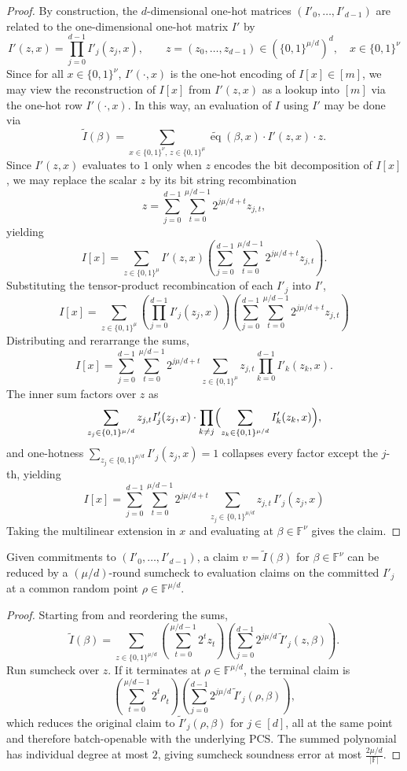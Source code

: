 \begin{proof}
By construction, the $d$-dimensional one-hot matrices $(I'_0,\ldots,I'_{d-1})$ are related to the one-dimensional one-hot matrix $I'$ by
\[
I'(z,x)=\prod_{j=0}^{d-1}I'_j(z_j,x),
\qquad
z=(z_0,\ldots,z_{d-1})\in(\{0,1\}^{\mu/d})^{d},
\quad
x\in\{0,1\}^{\nu}
\]
Since for all $x\in\{0,1\}^{\nu}$, $I'(\cdot,x)$ is the one-hot encoding of $I[x]\in[m]$,
we may view the reconstruction of $I[x]$ from $I'(z,x)$ as a lookup into $[m]$ via the one-hot row 
$I'(\cdot,x)$. In this way, an evaluation of $I$ using $I'$ may be done via
\[
\widetilde{I}(\beta)
=
\sum_{x\in\{0,1\}^{\nu},\,z\in\{0,1\}^{\mu}}
\widetilde{\operatorname{eq}}(\beta,x)\cdot I'(z,x)\cdot z.
\]
Since $I'(z,x)$ evaluates to $1$ only when $z$ encodes the bit decomposition of $I[x]$,
we may replace the scalar $z$ by its bit string recombination 
\[
z
=
\sum_{j=0}^{d-1}\sum_{t=0}^{\mu/d-1}
2^{j\mu/d+t}z_{j,t},
\]
yielding
\[
I[x]
=
\sum_{z\in\{0,1\}^{\mu}}
I'(z,x)
\left(
\sum_{j=0}^{d-1}\sum_{t=0}^{\mu/d-1}
2^{j\mu/d+t}z_{j,t}
\right).
\]
Substituting the tensor-product recombincation of each $I'_j$ into $I'$,
\[
I[x]
=
\sum_{z\in\{0,1\}^{\mu}}
\left(
\prod_{j=0}^{d-1}I'_j(z_j,x)
\right)
\left(
\sum_{j=0}^{d-1}\sum_{t=0}^{\mu/d-1}
2^{j\mu/d+t}z_{j,t}
\right)
\]
Distributing and rerarrange the sums,
\[
I[x]
=
\sum_{j=0}^{d-1}\sum_{t=0}^{\mu/d-1}
2^{j\mu/d+t}
\sum_{z\in\{0,1\}^{\mu}}
z_{j,t}
\prod_{k=0}^{d-1}I'_k(z_k,x).
\]
The inner sum factors over $z$ as
\[
\sum_{z_j\in\{0,1\}^{\mu/d}}z_{j,t}I'_j(z_j,x)
\cdot
\prod_{k\neq j}\Bigl(\sum_{z_k\in\{0,1\}^{\mu/d}}I'_k(z_k,x)\Bigr),
\]
and one-hotness $\sum_{z_j\in\{0,1\}^{\mu/d}}I'_j(z_j,x)=1$ collapses every factor except the $j$-th, yielding
\[
I[x]
=
\sum_{j=0}^{d-1}\sum_{t=0}^{\mu/d-1}
2^{j\mu/d+t}
\sum_{z_j\in\{0,1\}^{\mu/d}}
z_{j,t}\,I'_j(z_j,x)
\]
Taking the multilinear extension in $x$ and evaluating at $\beta\in\mathbb{F}^\nu$ gives the claim.
\end{proof}


\begin{theorem}\label{thm:reconstruct-sumcheck}\label{thm:reconstruction}
Given commitments to $(I'_0,\ldots,I'_{d-1})$, a claim $v=\widetilde{I}(\beta)$ for $\beta\in\mathbb{F}^\nu$ can be reduced by a $(\mu/d)$-round sumcheck to evaluation claims on the committed $I'_j$ at a common random point $\rho\in\mathbb{F}^{\mu/d}$.
\end{theorem}

\begin{proof}
Starting from  and reordering the sums,
\[
\widetilde{I}(\beta)
=
\sum_{z\in\{0,1\}^{\mu/d}}
\left(\sum_{t=0}^{\mu/d-1}2^{t}z_{t}\right)
\left(\sum_{j=0}^{d-1}2^{j\mu/d}\,\widetilde{I}'_j(z,\beta)\right).
\]
Run sumcheck over $z$. If it terminates at $\rho\in\mathbb{F}^{\mu/d}$, the terminal claim is
\[
\left(\sum_{t=0}^{\mu/d-1}2^{t}\rho_{t}\right)
\left(\sum_{j=0}^{d-1}2^{j\mu/d}\,\widetilde{I}'_j(\rho,\beta)\right),
\]
which reduces the original claim to
$\widetilde{I}'_j(\rho,\beta)$ for $j\in[d]$,
all at the same point and therefore batch-openable with the underlying PCS.
The summed polynomial has individual degree at most $2$, giving sumcheck soundness error at most $\frac{2\mu/d}{|\mathbb{F}|}$.
\end{proof}

